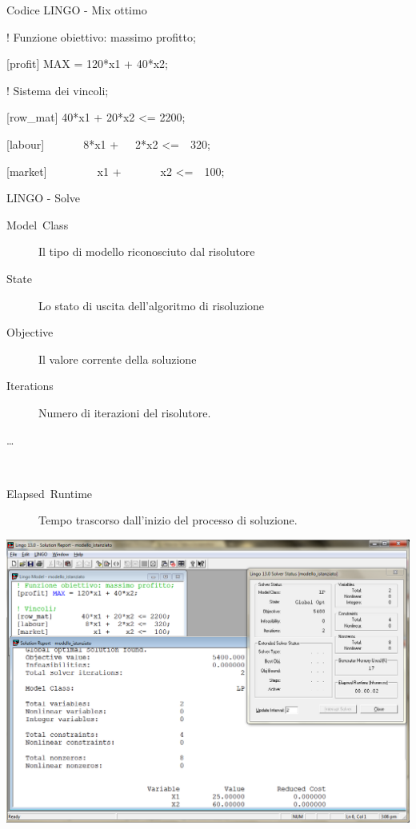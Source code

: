 \documentclass{beamer}
\def\lyxframeend{} %
\begin{document}
\begin{exampleblock}
{Codice LINGO - Mix ottimo}

{\small
\textcolor{comment_c}{! Funzione obiettivo: massimo profitto;}\par

\textcolor{rowname_c}{{[}profit{]}} \textcolor{reserved_c}{MAX} = 120{*}x1 + 40{*}x2;\par

\textcolor{comment_c}{! Sistema dei vincoli;}\par

\textcolor{rowname_c}{{[}row\_mat{]}} 40{*}x1 + 20{*}x2 <= 2200;\par

\textcolor{rowname_c}{{[}labour{]}}~~~~~~~8{*}x1 +~~~2{*}x2 <=~~320;\par

\textcolor{rowname_c}{{[}market{]}}~~~~~~~~~x1 +~~~~~~~x2 <=~~100;\par
}
\end{exampleblock}

\lyxframeend{}
LINGO - Solve

\begin{description}
\item [{Model~Class}] Il tipo di modello riconosciuto dal risolutore
\item [{State}] Lo stato di uscita dell’algoritmo di risoluzione
\item [{Objective}] Il valore corrente della soluzione
\item [{Iterations}] Numero di iterazioni del risolutore.
\item [{…}]~
\item [{Elapsed~Runtime}] Tempo trascorso dall’inizio del processo di
soluzione. 
\end{description}

\lyxframeend{}

\begin{center}
\includegraphics[height=0.85\textheight]{img/lingo_mod_istanz}
\par\end{center}
\end{document}
